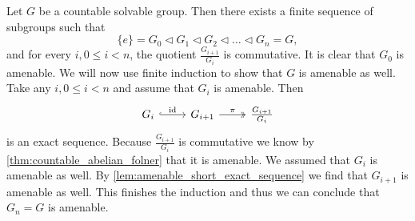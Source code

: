 Let $G$ be a countable solvable group. Then there exists a finite sequence of subgroups such that 
$$\{e\} = G_0 \triangleleft G_1 \triangleleft G_2 \triangleleft \dots \triangleleft G_n = G,$$ and for every $i, 0\le i<n$, the quotient $\frac{G_{i+1}}{G_i}$ is commutative. 
It is clear that $G_0$ is amenable. We will now use finite induction to show that $G$ is amenable as well. 
Take any $i, 0\le i<n$ and assume that $G_i$ is amenable. Then 
\[\begin{tikzcd}
    G_i \arrow[r, "\id", hook] & G_{i+1} \arrow[r, "\pi", two heads] & \frac{G_{i+1}}{G_i}
    \end{tikzcd}\]
is an exact sequence. Because $\frac{G_{i+1}}{G_i}$ is commutative we know by \cref{thm:countable_abelian_folner} that it is amenable. We assumed that $G_i$ is amenable as well. By \cref{lem:amenable_short_exact_sequence} we find that $G_{i+1}$ is amenable as well. This finishes the induction and thus we can conclude that $G_n = G$ is amenable.
